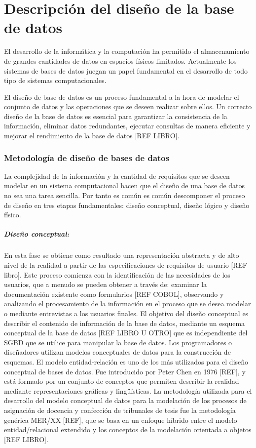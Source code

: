 \chapter{Descripción del diseño de la base de datos}\label{chapter:database}
El desarrollo de la informática y la computación ha permitido
el almacenamiento de grandes cantidades de datos en espacios 
físicos limitados. Actualmente los sistemas de bases de datos juegan
un papel fundamental en el desarrollo de todo tipo de sistemas computacionales.

El diseño de base de datos es un proceso fundamental a la hora 
de modelar el conjunto de datos y las operaciones que se deseen
realizar sobre ellos. Un correcto diseño de la base de datos
es esencial para garantizar la consistencia de la información,
eliminar datos redundantes, ejecutar consultas de manera 
eficiente y mejorar el rendimiento de la base de datos [REF LIBRO]. 

\subsection{Metodología de diseño de bases de datos}
La complejidad de la información y la cantidad de requisitos que se 
deseen modelar en un sistema computacional hacen que el diseño de una 
base de datos no sea una tarea sencilla. Por tanto es común es común 
descomponer el proceso de diseño en tres etapas fundamentales: diseño conceptual,
diseño lógico y diseño físico. 

\paragraph{Diseño conceptual:}
En esta fase se obtiene como resultado una representación 
abstracta y de alto nivel de la realidad a partir de las 
especificaciones de requisitos de usuario [REF libro]. Este 
proceso comienza con la identificación de las necesidades de los 
usuarios, que a menudo se pueden obtener a través de: examinar
la documentación existente como formularios [REF COBOL], observando y
analizando el procesamiento de la información en el proceso que 
se desea modelar o mediante entrevistas a los usuarios finales.
El objetivo del diseño conceptual es describir el contenido de 
información de la base de datos, mediante un esquema conceptual de
la base de datos [REF LIBRO U OTRO] que es independiente del SGBD
que se utilice para manipular la base de datos.
Los programadores o diseñadores utilizan modelos conceptuales de datos 
para la construcción de esquemas. El modelo entidad-relación es uno 
de los más utilizados para el diseño conceptual de bases de datos. Fue 
introducido por Peter Chen en 1976 [REF], y está formado por 
un conjunto de conceptos que permiten describir la realidad mediante 
representaciones gráficas y lingüísticas. La metodología utilizada 
para el desarrollo del modelo conceptual de datos para la modelación 
de los procesos de asignación de docencia y confección de tribunales de 
tesis fue la metodología genérica MER/XX [REF], que se basa en un enfoque
híbrido entre el modelo entidad/relacional extendido y los conceptos de la 
modelación orientada a objetos [REF LIBRO]. 


